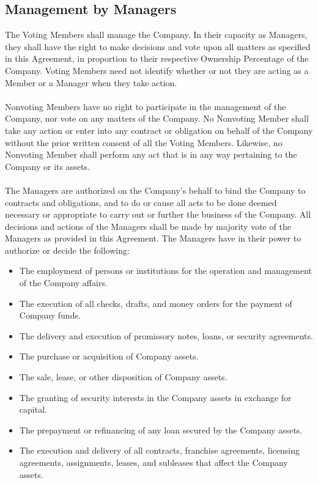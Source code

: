 \documentclass[11pt]{article}
\begin{document}
\subsection{Management by Managers}
The Voting Members shall manage the Company. In their capacity as Managers, they shall have the right to make decisions and vote upon all matters as specified in this Agreement, in proportion to their respective Ownership Percentage of the Company. Voting Members need not identify whether or not they are acting as a Member or a Manager when they take action.\\\\
Nonvoting Members have no right to participate in the management of the Company, nor vote on any matters of the Company. No Nonvoting Member shall take any action or enter into any contract or obligation on behalf of the Company without the prior written consent of all the Voting Members. Likewise, no Nonvoting Member shall perform any act that is in any way pertaining to the Company or its assets.\\\\
The Managers are authorized on the Company's behalf to bind the Company to contracts and obligations, and to do or cause all acts to be done deemed necessary or appropriate to carry out or further the business of the Company. All decisions and actions of the Managers shall be made by majority vote of the Managers as provided in this Agreement. The Managers have in their power to authorize or decide the following:\\
\begin{itemize}
\item The employment of persons or institutions for the operation and management of the Company affairs.
\item The execution of all checks, drafts, and money orders for the payment of Company funds.
\item The delivery and execution of promissory notes, loans, or security agreements.
\item The purchase or acquisition of Company assets.
\item The sale, lease, or other disposition of Company assets.
\item The granting of security interests in the Company assets in exchange for capital.
\item The prepayment or refinancing of any loan secured by the Company assets.
\item The execution and delivery of all contracts, franchise agreements, licensing agreements, assignments, leases, and subleases that affect the Company assets.\\
\end{itemize}
\end{document}
